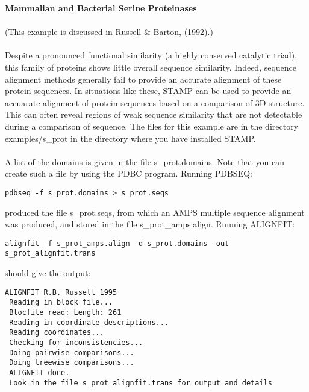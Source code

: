 {\bf Mammalian and Bacterial Serine Proteinases}\\
\\
(This example is discussed in Russell \& Barton, (1992).\nocite{rb92b})\\
\\
Despite a pronounced functional similarity (a highly conserved catalytic 
triad), this family of proteins shows little overall sequence similarity.  
Indeed, sequence alignment methods generally fail to provide an accurate
alignment of these protein sequences.  In situations like these, STAMP 
can be used to provide an accuarate alignment of protein sequences based 
on a comparison of 3D structure.  This can often reveal regions of weak 
sequence similarity that are not detectable during a comparison of 
sequence.  The files for this example are in the directory examples/s\_prot in the 
directory where you have installed STAMP.\\
\\
A list of the domains is given in the file s\_prot.domains.  Note
 that you can create such a file by using the PDBC program.  
Running PDBSEQ:\\

\begin{scriptsize}\begin{verbatim}
pdbseq -f s_prot.domains > s_prot.seqs
\end{verbatim} \end{scriptsize}

produced the file s\_prot.seqs, from which an AMPS multiple
sequence alignment was produced, and stored in the file 
s\_prot\_amps.align.  Running ALIGNFIT:\\

\begin{scriptsize}\begin{verbatim}
alignfit -f s_prot_amps.align -d s_prot.domains -out s_prot_alignfit.trans
\end{verbatim} \end{scriptsize}

should give the output:\\

\begin{scriptsize}\begin{verbatim}
ALIGNFIT R.B. Russell 1995
 Reading in block file...
 Blocfile read: Length: 261
 Reading in coordinate descriptions...
 Reading coordinates...
 Checking for inconsistencies...
 Doing pairwise comparisons...
 Doing treewise comparisons...
 ALIGNFIT done.
 Look in the file s_prot_alignfit.trans for output and details
\end{verbatim} \end{scriptsize}


